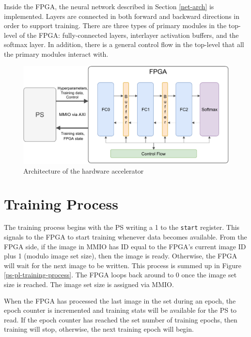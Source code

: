 Inside the FPGA, the neural network described in Section \ref{net-arch} is implemented. Layers are connected in both forward and backward directions in order to support training. There are three types of primary modules in the top-level of the FPGA: fully-connected layers, interlayer activation buffers, and the softmax layer. In addition, there is a general control flow in the top-level that all the primary modules interact with.

\begin{figure}
	\centering 
	\includegraphics[width=\textwidth]{figures/overall_arch}
	\caption{Architecture of the hardware accelerator}\label{overall-arch}
\end{figure}


\section{Training Process}
The training process begins with the PS writing a 1 to the \texttt{start} register. This signals to the FPGA to start training whenever data becomes available. From the FPGA side, if the image in MMIO has ID equal to the FPGA's current image ID plus 1 (modulo image set size), then the image is ready.  Otherwise, the FPGA will wait for the next image to be written. This process is summed up in Figure \ref{ps-pl-training-process}. The FPGA loops back around to 0 once the image set size is reached. The image set size is assigned via MMIO. 

When the FPGA has processed the last image in the set during an epoch, the epoch counter is incremented and training stats will be available for the PS to read. If the epoch counter has reached the set number of training epochs, then training will stop, otherwise, the next training epoch will begin. 


